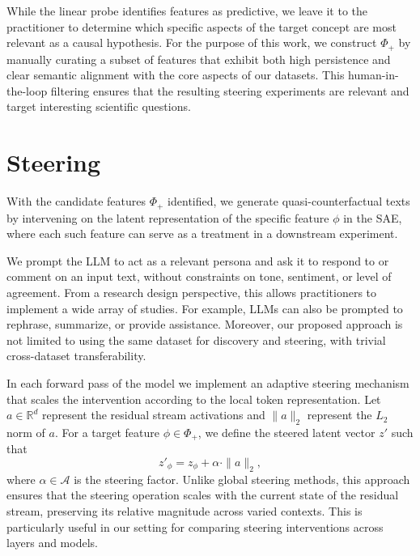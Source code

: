 \documentclass{article}
\theoremstyle{plain}
\theoremstyle{definition}
\theoremstyle{remark}
\begin{document}
While the linear probe identifies features as predictive, we leave it to the practitioner to determine which specific aspects of the target concept are most relevant as a causal hypothesis. For the purpose of this work, we construct $\Phi_+$ by manually curating a subset of features that exhibit both high persistence and clear semantic alignment with the core aspects of our datasets. This human-in-the-loop filtering ensures that the resulting steering experiments are relevant and target interesting scientific questions.

\section{Steering}
\label{sec:steering}

With the candidate features $\Phi_{+}$ identified, we generate quasi-counterfactual texts by intervening on the latent representation of the specific feature $\phi$ in the SAE, where each such feature can serve as a treatment in a downstream experiment.

We prompt the LLM to act as a relevant persona and ask it to respond to or comment on an input text, without constraints on tone, sentiment, or level of agreement. From a research design perspective, this allows practitioners to implement a wide array of studies. For example, LLMs can also be prompted to rephrase, summarize, or provide assistance. Moreover, our proposed approach is not limited to using the same dataset for discovery and steering, with trivial cross-dataset transferability.

In each forward pass of the model we implement an adaptive steering mechanism that scales the intervention according to the local token representation. Let $a \in \mathbb{R}^d$ represent the residual stream activations and $\|a\|_2$ represent the $L_2$ norm of $a$. For a target feature $\phi \in \Phi_{+}$, we define the steered latent vector $z'$ such that
\begin{equation}
    z'_{\phi} = z_{\phi} + \alpha \cdot \|a\|_2,
    \label{eq:steeredacts}
\end{equation}
where $\alpha \in \mathcal{A}$ is the steering factor. Unlike global steering methods, this approach ensures that the steering operation scales with the current state of the residual stream, preserving its relative magnitude across varied contexts. This is particularly useful in our setting for comparing steering interventions across layers and models.
\end{document}
